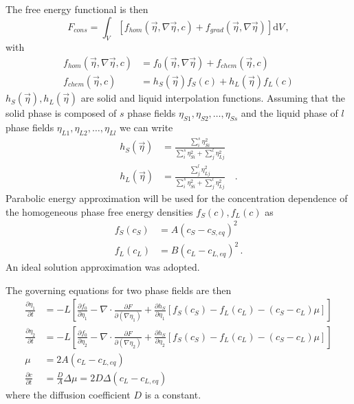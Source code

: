 		The free energy functional is then
		\begin{equation}
			F_{cons} = \int_V \left[ f_{hom}(\vec{\eta},\nabla\vec{\eta},c) + f_{grad}(\vec{\eta},\nabla\vec{\eta}) \right] \mathrm{d}V \,,
		\end{equation}
		with   
		\begin{align}
			f_{hom}(\vec{\eta},\nabla\vec{\eta},c)  &= f_0(\vec{\eta},\nabla\vec{\eta}) + f_{chem}(\vec{\eta},c) \\
			f_{chem}(\vec{\eta},c) &= h_S(\vec{\eta})f_S(c) + h_L(\vec{\eta})f_L(c)
		\end{align}
		$h_S(\vec{\eta}), h_L(\vec{\eta})$ are solid and liquid interpolation functions. Assuming that the solid phase is composed of $s$ phase fields $\eta_{S1},\eta_{S2},\dots,\eta_{Ss}$ and the liquid phase of $l$ phase fields $\eta_{L1},\eta_{L2},\dots,\eta_{Ll}$ we can write
		\begin{align}
			h_S(\vec{\eta}) &= \frac{\sum_i^s \eta_{Si}^2}{\sum_i^s \eta_{Si}^2 + \sum_j^l \eta_{Lj}^2}   \\
			h_L(\vec{\eta}) &= \frac{\sum_j^l \eta_{Lj}^2}{\sum_i^s \eta_{Si}^2 + \sum_j^l \eta_{Lj}^2} \quad .
		\end{align}
		Parabolic energy approximation will be used for the concentration dependence of the homogeneous phase free energy densities $f_S(c), f_L(c)$ as
		\begin{align}
			f_S(c_S) &= A(c_S-c_{S,eq})^2 \\
			f_L(c_L) &= B(c_L-c_{L,eq})^2 \,.
		\end{align}
		An ideal solution approximation was adopted.
		
		The governing equations for two phase fields are then
		\begin{align} \label{eq_governing_eq_volcons_1}
			\frac{\partial \eta_1}{\partial t} &= -L\left[\frac{\partial f_0}{\partial \eta_1} - \nabla\cdot \frac{\partial F}{\partial (\nabla\eta_1)} + \frac{\partial h_S}{\partial \eta_1}[f_S(c_S) - f_L(c_L) - (c_S-c_L)\mu] \right] \\
			\frac{\partial \eta_2}{\partial t} &= -L\left[\frac{\partial f_0}{\partial \eta_2} - \nabla\cdot \frac{\partial F}{\partial (\nabla\eta_2)} + \frac{\partial h_S}{\partial \eta_2}[f_S(c_S) - f_L(c_L) - (c_S-c_L)\mu] \right] \\
			\mu &= 2A(c_L-c_{L,eq})\\
			\frac{\partial c}{\partial t} &= \frac{D}{A}\Delta\mu  = 2D\Delta(c_L-c_{L,eq})  \label{eq_governing_eq_volcons_end}
		\end{align}
		where the diffusion coefficient $D$ is a constant.
		
